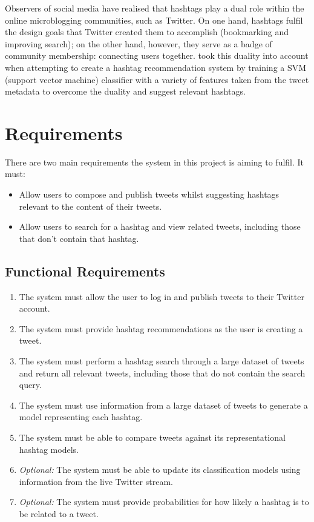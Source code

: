 \documentclass[11pt,a4paper]{report}
\begin{document}
Observers of social media have realised that hashtags play a dual role within the online microblogging communities, such as Twitter. On one hand, hashtags fulfil the design goals that Twitter created them to accomplish (bookmarking and improving search); on the other hand, however, they serve as a badge of community membership: connecting users together. \textcite{Yang:2012} took this duality into account when attempting to create a hashtag recommendation system by training a SVM (support vector machine) classifier with a variety of features taken from the tweet metadata to overcome the duality and suggest relevant hashtags.

\pagebreak

\chapter{Requirements}
There are two main requirements the system in this project is aiming to fulfil. It must:
\begin{itemize}
    \item Allow users to compose and publish tweets whilst suggesting hashtags relevant to the content of their tweets.
    \item Allow users to search for a hashtag and view related tweets, including those that don't contain that hashtag.
\end{itemize}

\section{Functional Requirements}
\begin{enumerate}
    \item \label{func:publish} The system must allow the user to log in and publish tweets to their Twitter account.
    \item \label{func:suggest} The system must provide hashtag recommendations as the user is creating a tweet.
    \item \label{func:search} The system must perform a hashtag search through a large dataset of tweets and return all relevant tweets, including those that do not contain the search query.
    \item \label{func:genmodel} The system must use information from a large dataset of tweets to generate a model representing each hashtag.
    \item \label{func:compmodels} The system must be able to compare tweets against its representational hashtag models.
    \item \label{func:stream} \emph{Optional:} The system must be able to update its classification models using information from the live Twitter stream.
    \item \label{func:probabilities} \emph{Optional:} The system must provide probabilities for how likely a hashtag is to be related to a tweet.
\end{enumerate}
\end{document}
